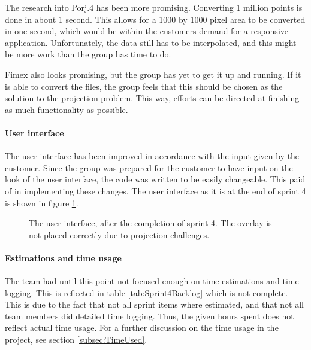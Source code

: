 \documentclass[11pt,a4paper,titlepage,oneside]{report}
\begin{document}
The research into Porj.4 has been more promising. Converting 1 million points is done in about 1 second. This allows for a 1000 by 1000 pixel area to be converted in one second, which would be within the customers demand for a responsive application. Unfortunately, the data still has to be interpolated, and this might be more work than the group has time to do.

\gls{Fimex} also looks promising, but the group has yet to get it up and running. If it is able to convert the files, the group feels that this should be chosen as the solution to the projection problem. This way, efforts can be directed at finishing as much functionality as possible. 

\paragraph{User interface}
The user interface has been improved in accordance with the input given by the customer. Since the group was prepared for the customer to have input on the look of the user interface, the code was written to be easily changeable. This paid of in implementing these changes. The user interface as it is at the end of sprint 4 is shown in figure \ref{fig:UIAfterSprint4}.

\begin{figure}[t]
\begin{center}
\caption{The user interface, after the completion of sprint 4. The overlay is not placed correctly due to projection challenges.}
\label{fig:UIAfterSprint4}
\end{center}
\end{figure}

\paragraph{Estimations and time usage}
The team had until this point not focused enough on time estimations and time logging. This is reflected in table \ref{tab:Sprint4Backlog} which is not complete. This is due to the fact that not all sprint items where estimated, and that not all team members did detailed time logging. Thus, the given hours spent does not reflect actual time usage. For a further discussion on the time usage in the project, see section \ref{subsec:TimeUsed}.
\end{document}
